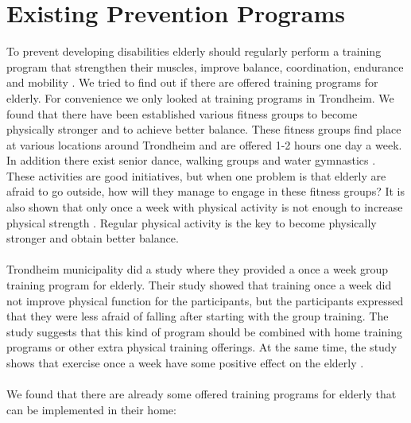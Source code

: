 \section{Existing Prevention Programs}
To prevent developing disabilities elderly should regularly perform a training program that strengthen their muscles, improve balance, coordination, endurance and mobility \cite{gruppetrening-trheim}. We tried to find out if there are offered training programs for elderly. For convenience we only looked at training programs in Trondheim. We found that there have been established various fitness groups to become physically stronger and to achieve better balance. These fitness groups find place at various locations around Trondheim and are offered 1-2 hours one day a week. In addition there exist senior dance, walking groups and water gymnastics \cite{trim}. These activities are good initiatives, but when one problem is that elderly are afraid to go outside, how will they manage to engage in these fitness groups? It is also shown that only once a week with physical activity is not enough to increase physical strength \cite{gruppetrening-trheim}. Regular physical activity is the key to become physically stronger and obtain better balance. \\ \\
Trondheim municipality did a study where they provided a once a week group training program for elderly. Their study showed that training once a week did not improve physical function for the participants, but the participants expressed that they were less afraid of falling after starting with the group training. The study suggests that this kind of program should be combined with home training programs or other extra physical training offerings. At the same time, the study shows that exercise once a week have some positive effect on the elderly \cite{gruppetrening-trheim}. \\ \\
We found that there are already some offered training programs for elderly that can be implemented in their home:\\ \\
